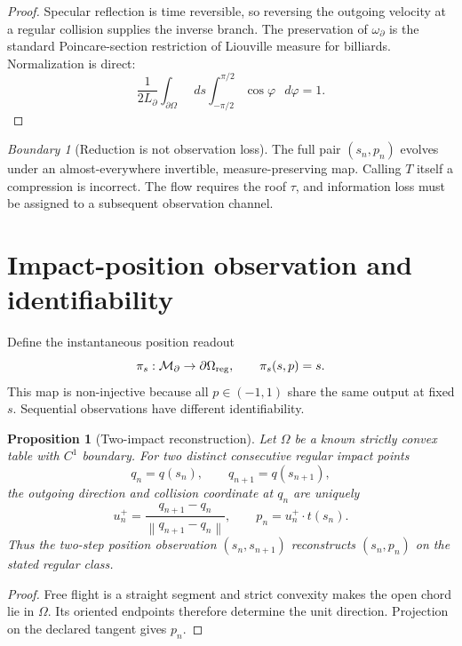 \documentclass[11pt,a4paper]{article}
\theoremstyle{definition}
\theoremstyle{plain}
\newtheorem{proposition}[definition]{Proposition}
\theoremstyle{remark}
\newtheorem{warning}[definition]{Boundary}
\newcommand{\dd}{\mathop{}\!d}
\newcommand{\norm}[1]{\left\lVert #1\right\rVert}
\newcommand{\Mcal}{\mathcal M}
\begin{document}
\begin{proof}
Specular reflection is time reversible, so reversing the outgoing
velocity at a regular collision supplies the inverse branch. The
preservation of \(\omega_\partial\) is the standard Poincare-section
restriction of Liouville measure for billiards. Normalization is
direct:
\[
\frac1{2L_\partial}
\int_{\partial\Omega}\!\dd s
\int_{-\pi/2}^{\pi/2}\!\cos\varphi\,\dd\varphi=1.
\]
\end{proof}

\begin{warning}[Reduction is not observation loss]
The full pair \((s_n,p_n)\) evolves under an almost-everywhere
invertible, measure-preserving map. Calling \(T\) itself a compression
is incorrect. The flow requires the roof \(\tau\), and information
loss must be assigned to a subsequent observation channel.
\end{warning}

\section{Impact-position observation and identifiability}

Define the instantaneous position readout
\[
\pi_s:\Mcal_\partial\to\partial\Omega_{\rm reg},
\qquad \pi_s(s,p)=s.
\]
This map is non-injective because all \(p\in(-1,1)\) share the same
output at fixed \(s\). Sequential observations have different
identifiability.

\begin{proposition}[Two-impact reconstruction]\label{prop:two-impact}
Let \(\Omega\) be a known strictly convex table with \(C^1\) boundary.
For two distinct consecutive regular impact points
\[
q_n=q(s_n),\qquad q_{n+1}=q(s_{n+1}),
\]
the outgoing direction and collision coordinate at \(q_n\) are
uniquely
\begin{equation}\label{eq:two-impact-reconstruction}
u_n^+
=\frac{q_{n+1}-q_n}{\norm{q_{n+1}-q_n}},
\qquad
p_n=u_n^+\cdot t(s_n).
\end{equation}
Thus the two-step position observation
\((s_n,s_{n+1})\) reconstructs \((s_n,p_n)\) on the stated regular
class.
\end{proposition}

\begin{proof}
Free flight is a straight segment and strict convexity makes the open
chord lie in \(\Omega\). Its oriented endpoints therefore determine
the unit direction. Projection on the declared tangent gives \(p_n\).
\end{proof}
\end{document}
